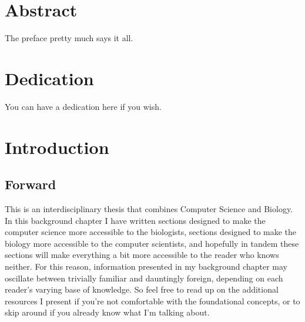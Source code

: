 \documentclass[12pt,twoside]{reedthesis}
\begin{document}
    \tableofcontents
    \listoftables
    \listoffigures

    \chapter*{Abstract}
	The preface pretty much says it all.
	
	\chapter*{Dedication}
	You can have a dedication here if you wish.

  \mainmatter %
  \pagestyle{fancyplain} %


    \chapter*{Introduction}




\section{Forward}
This is an interdisciplinary thesis that combines Computer Science and Biology. In this background chapter I have written sections designed to make the computer science more accessible to the biologists, sections designed to make the biology more accessible to the computer scientists, and hopefully in tandem these sections will make everything a bit more accessible to the reader who knows neither. For this reason, information presented in my background chapter may oscillate between trivially familiar and dauntingly foreign, depending on each reader's varying base of knowledge. So feel free to read up on the additional resources I present if you're not comfortable with the foundational concepts, or to skip around if you already know what I'm talking about.
\end{document}
